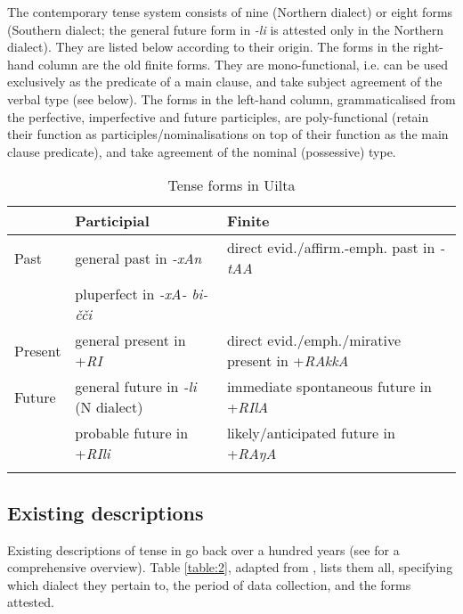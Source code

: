 \documentclass[output=paper,colorlinks,citecolor=brown]{langscibook}
\begin{document}
The contemporary  tense system consists of nine (Northern dialect) or eight forms (Southern dialect; the general future form in \textit{-li} is attested only in the Northern dialect). They are listed below according to their origin. The forms in the right-hand column are the old finite forms. They are mono-functional, i.e. can be used exclusively as the predicate of a main clause, and take subject agreement of the verbal type (see below). The forms in the left-hand column, grammaticalised from the perfective, imperfective and future participles, are poly-functional (retain their function as participles/nominalisations on top of their function as the main clause predicate), and take agreement of the nominal (possessive) type.

\begin{table}
\caption{Tense forms in Uilta\label{table:1}}
 \begin{tabularx}{\textwidth}{ l  l  Q }
  \lsptoprule
& Participial & Finite\\
  \midrule
Past	  &   general past in \textit{-xAn}           & direct evid./affirm.-emph. past in \textit{-tAA}\\
&   pluperfect in \textit{-xA- bi-čči}         & \\
\midrule
Present  &   general present in +\textit{RI}          & direct evid./emph./mirative present in +\textit{RAkkA}\\
\midrule
Future &   general future in \textit{-li} (N dialect)          & immediate spontaneous future in +\textit{RIlA}\\
&  probable future in +\textit{RIli}          & likely/anticipated future in +\textit{RAŋA}\\
  \lspbottomrule
 \end{tabularx}
\end{table}

\subsection{Existing descriptions}\label{Section3.2.1}

Existing descriptions of tense in  go back over a hundred years (see \citealt{Yamada_2013} for a comprehensive overview). Table \ref{table:2}, adapted from \citet[90]{Yamada_2013}, lists them all, specifying which dialect they pertain to, the period of data collection, and the forms attested.
\end{document}
